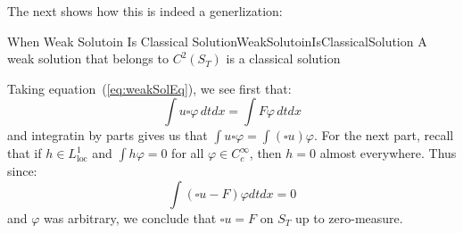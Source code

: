 \documentclass{book}
\newenvironment{Proof}[1][]
  {\begin{ProofTcb}[#1]}
  {\end{ProofTcb}}
\renewcommand{\phi}{\varphi}
\begin{document}
The next shows how this is indeed a generlization:

\begin{prop}{When Weak Solutoin Is Classical Solution}{WeakSolutoinIsClassicalSolution}
	A weak solution that belongs to $C^2(S_T)$ is a classical solution
\end{prop}

\begin{Proof}
	Taking equation~(\ref{eq:weakSolEq}),  we see first that:
	\[
		\int u\square \phi\, dtdx = \int F\phi\, dtdx
	\]
	and integratin by parts gives us that $\int u\square \phi = \int(\square u)\phi$. For the next part, recall that if
	$h \in L_{\text{loc}}^1$ and $\int h\phi = 0$ for all $\phi \in C_c^\infty$, then $h = 0$ almost everywhere. Thus
	since:
	\[
		\int (\square u - F)\phi dtdx = 0
	\]
	and $\phi$ was arbitrary, we conclude that $\square u = F$ on $S_T$ up to zero-measure.


\end{Proof}
\end{document}
